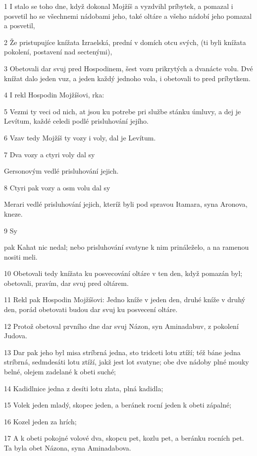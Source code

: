 \par 1 I stalo se toho dne, když dokonal Mojžíš a vyzdvihl príbytek, a pomazal i posvetil ho se všechnemi nádobami jeho, také oltáre a všeho nádobí jeho pomazal a posvetil,
\par 2 Že pristupujíce knížata Izraelská, prední v domích otcu svých, (ti byli knížata pokolení, postavení nad sectenými),
\par 3 Obetovali dar svuj pred Hospodinem, šest vozu prikrytých a dvanácte volu. Dvé knížat dalo jeden vuz, a jeden každý jednoho vola, i obetovali to pred príbytkem.
\par 4 I rekl Hospodin Mojžíšovi, rka:
\par 5 Vezmi ty veci od nich, at jsou ku potrebe pri službe stánku úmluvy, a dej je Levítum, každé celedi podlé prisluhování jejího.
\par 6 Vzav tedy Mojžíš ty vozy i voly, dal je Levítum.
\par 7 Dva vozy a ctyri voly dal sy\par Gersonovým vedlé prisluhování jejich.
\par 8 Ctyri pak vozy a osm volu dal sy\par Merari vedlé prisluhování jejich, kteríž byli pod spravou Itamara, syna Aronova, kneze.
\par 9 Sy\par pak Kahat nic nedal; nebo prisluhování svatyne k nim prináleželo, a na ramenou nositi meli.
\par 10 Obetovali tedy knížata ku posvecování oltáre v ten den, když pomazán byl; obetovali, pravím, dar svuj pred oltárem.
\par 11 Rekl pak Hospodin Mojžíšovi: Jedno kníže v jeden den, druhé kníže v druhý den, porád obetovati budou dar svuj ku posvecení oltáre.
\par 12 Protož obetoval prvního dne dar svuj Názon, syn Aminadabuv, z pokolení Judova.
\par 13 Dar pak jeho byl misa stríbrná jedna, sto tridceti lotu ztíží; též báne jedna stríbrná, sedmdesáti lotu ztíží, jakž jest lot svatyne; obe dve nádoby plné mouky belné, olejem zadelané k obeti suché;
\par 14 Kadidlnice jedna z desíti lotu zlata, plná kadidla;
\par 15 Volek jeden mladý, skopec jeden, a beránek rocní jeden k obeti zápalné;
\par 16 Kozel jeden za hrích;
\par 17 A k obeti pokojné volové dva, skopcu pet, kozlu pet, a beránku rocních pet. Ta byla obet Názona, syna Aminadabova.
